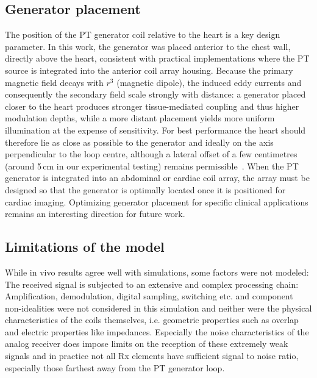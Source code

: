 \documentclass[
]{article}
\begin{document}
\subsection{Generator placement}\label{generator-placement}

The position of the PT generator coil relative to the heart is a key design parameter. In this work, the generator was placed anterior to the chest wall, directly above the heart, consistent with practical implementations where the PT source is integrated into the anterior coil array housing. Because the primary magnetic field decays with $r^{3}$ (magnetic dipole), the induced eddy currents and consequently the secondary field scale strongly with distance: a generator placed closer to the heart produces stronger tissue-mediated coupling and thus higher modulation depths, while a more distant placement yields more uniform illumination at the expense of sensitivity. For best performance the heart should therefore lie as close as possible to the generator and ideally on the axis perpendicular to the loop centre, although a lateral offset of a few centimetres (around 5\,cm in our experimental testing) remains permissible~\cite{Bacher2017CardiacStudy, Bacher2017PilotInitialization}. When the PT generator is integrated into an abdominal or cardiac coil array, the array must be designed so that the generator is optimally located once it is positioned for cardiac imaging. Optimizing generator placement for specific clinical applications remains an interesting direction for future work.

\subsection{Limitations of the model}\label{limitations-of-the-model}

While in vivo results agree well with simulations, some factors were not
modeled: The received signal is subjected to an extensive and complex
processing chain: Amplification, demodulation, digital sampling,
switching etc. and component non-idealities were not considered in this
simulation and neither were the physical characteristics of the coils
themselves, i.e. geometric properties such as overlap and electric
properties like impedances. Especially the noise characteristics of the
analog receiver does impose limits on the reception of these extremely
weak signals and in practice not all Rx elements have sufficient signal
to noise ratio, especially those farthest away from the PT generator
loop.
\end{document}
